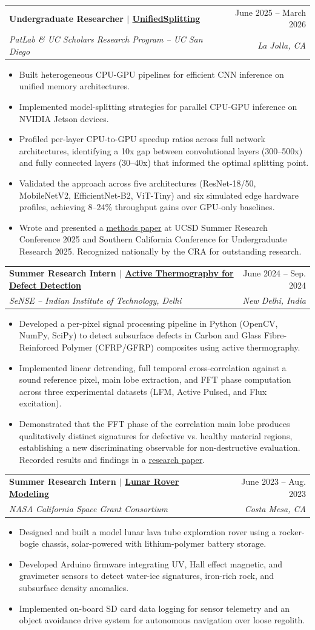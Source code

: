 \documentclass[letterpaper,11pt]{article}
\makeatletter
\newcommand{\resumeItem}[1]{
  \item\small{
    {#1 \vspace{-2pt}}
  }
}
\newcommand{\resumeSubheading}[4]{
  \vspace{-1pt}\item
    \begin{tabular*}{0.97\textwidth}[t]{l@{\extracolsep{\fill}}r}
      \textbf{#1} & #2 \\
      \textit{\small#3} & \textit{\small #4} \\
    \end{tabular*}\vspace{-8pt}
}
\newcommand{\resumeItemListStart}{\begin{itemize}}
\newcommand{\resumeItemListEnd}{\end{itemize}\vspace{-5pt}}
\makeatother
\begin{document}
    \resumeSubheading
      {Undergraduate Researcher $|$ \href{https://github.com/Ray149s/unifiedsplitting-orin/}{UnifiedSplitting}}{June 2025 -- March 2026}
      {PatLab \& UC Scholars Research Program -- UC San Diego}{La Jolla, CA}
      \resumeItemListStart
        \resumeItem{Built heterogeneous CPU-GPU pipelines for efficient CNN inference on unified memory architectures.}
        \resumeItem{Implemented model-splitting strategies for parallel CPU-GPU inference on NVIDIA Jetson devices.}
        \resumeItem{Profiled per-layer CPU-to-GPU speedup ratios across full network architectures, identifying a 10x gap between convolutional layers (300--500x) and fully connected layers (30--40x) that informed the optimal splitting point.}
        \resumeItem{Validated the approach across five architectures (ResNet-18/50, MobileNetV2, EfficientNet-B2, ViT-Tiny) and six simulated edge hardware profiles, achieving 8--24\% throughput gains over GPU-only baselines.}
        \resumeItem{Wrote and presented a \href{https://www.aypuri.com/SRC_paper.pdf}{methods paper} at UCSD Summer Research Conference 2025 and Southern California Conference for Undergraduate Research 2025. Recognized nationally by the CRA for outstanding research.}
      \resumeItemListEnd

    \resumeSubheading
      {Summer Research Intern $|$ \href{https://github.com/aypuri/iitd_sense_research/}{Active Thermography for Defect Detection}}{June 2024 -- Sep. 2024}
      {SeNSE -- Indian Institute of Technology, Delhi}{New Delhi, India}
      \resumeItemListStart
        \resumeItem{Developed a per-pixel signal processing pipeline in Python (OpenCV, NumPy, SciPy) to detect subsurface defects in Carbon and Glass Fibre-Reinforced Polymer (CFRP/GFRP) composites using active thermography.}
        \resumeItem{Implemented linear detrending, full temporal cross-correlation against a sound reference pixel, main lobe extraction, and FFT phase computation across three experimental datasets (LFM, Active Pulsed, and Flux excitation).}
        \resumeItem{Demonstrated that the FFT phase of the correlation main lobe produces qualitatively distinct signatures for defective vs. healthy material regions, establishing a new discriminating observable for non-destructive evaluation. Recorded results and findings in a \href{https://www.aypuri.com/SeNSE_Paper.pdf}{research paper}.}
      \resumeItemListEnd

    \resumeSubheading
      {Summer Research Intern $|$ \href{https://www.aypuri.com/NASA\%20Ca_SGC\%20Final\%20Poster.pdf}{Lunar Rover Modeling}}{June 2023 -- Aug. 2023}
      {NASA California Space Grant Consortium}{Costa Mesa, CA}
      \resumeItemListStart
        \resumeItem{Designed and built a model lunar lava tube exploration rover using a rocker-bogie chassis, solar-powered with lithium-polymer battery storage.}
        \resumeItem{Developed Arduino firmware integrating UV, Hall effect magnetic, and gravimeter sensors to detect water-ice signatures, iron-rich rock, and subsurface density anomalies.}
        \resumeItem{Implemented on-board SD card data logging for sensor telemetry and an object avoidance drive system for autonomous navigation over loose regolith.}
      \resumeItemListEnd
\end{document}
